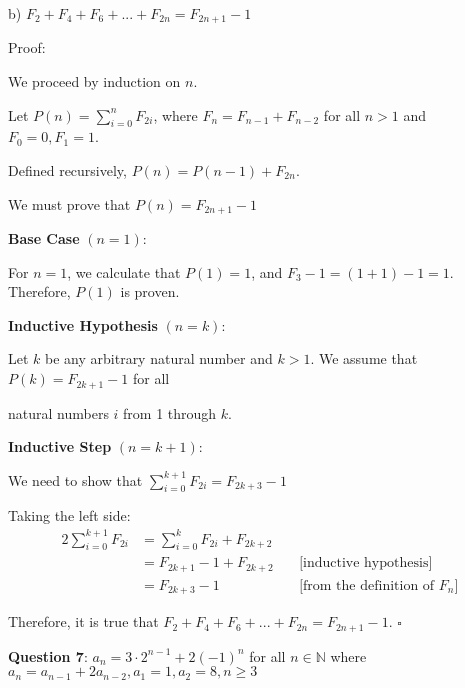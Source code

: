 \documentclass{article} %
\newcommand{\question}[2][]{\begin{flushleft}
        \textbf{Question #1}: #2

\end{flushleft}}
\begin{document}
    b) $F_2 + F_4 + F_6 + ... + F_{2n} = F_{2n + 1} - 1$

    Proof:

    We proceed by induction on $n$.

    Let $P(n) = \sum_{i = 0}^{n} F_{2i}$, where $F_n = F_{n - 1} + F_{n - 2}$ for all $n > 1$ and $F_0 = 0, F_1 = 1$.

    Defined recursively, $P(n) = P(n - 1) + F_{2n}$.

    We must prove that $P(n) = F_{2n + 1} - 1$

    \textbf{Base Case} $(n = 1)$:

    For $n = 1$, we calculate that $P(1) = 1$, and $F_3 - 1 = (1 + 1) - 1 = 1$. Therefore, $P(1)$ is proven.

    \textbf{Inductive Hypothesis} $(n = k)$:

    Let $k$ be any arbitrary natural number and $k > 1$. We assume that $P(k) = F_{2k+1} - 1$ for all
    
    natural numbers $i$ from 1 through $k$.

    \textbf{Inductive Step} $(n = k + 1)$:

    We need to show that $\sum_{i = 0}^{k + 1} F_{2i} = F_{2k + 3} - 1$
    
    Taking the left side:
    \begin{alignat*}{2}
        \sum_{i = 0}^{k + 1} F_{2i} &= \sum_{i = 0}^{k} F_{2i} + F_{2k + 2}\\
        &= F_{2k+1} - 1 + F_{2k + 2}\ &&\text{[inductive hypothesis]}\\
        &= F_{2k + 3} - 1\ &&\text{[from the definition of $F_n$]}
    \end{alignat*}

    Therefore, it is true that $F_2 + F_4 + F_6 + ... + F_{2n} = F_{2n + 1} - 1$. $\square$

    \newpage

                                                                   

    \question[7]{$a_n = 3 \cdot 2^{n - 1} + 2(-1)^n$ for all $n \in \mathbb{N}$ where $a_n = a_{n - 1} + 2a_{n-2}, a_1 = 1, a_2 = 8, n \geq 3$}
\end{document}
